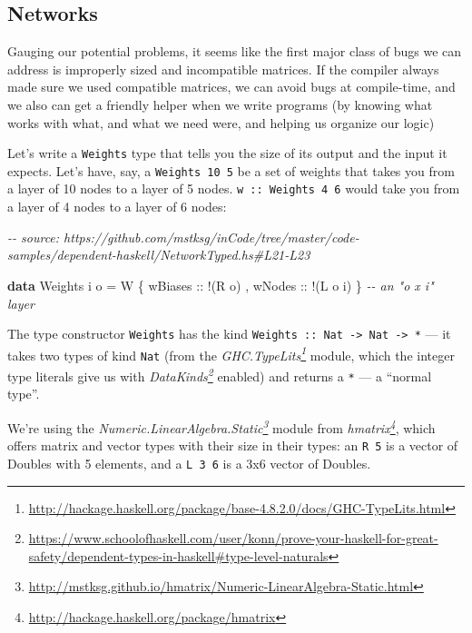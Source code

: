 \documentclass[]{article}
\newenvironment{Shaded}{}{}
\newcommand{\CommentTok}[1]{\textcolor[rgb]{0.38,0.63,0.69}{\textit{#1}}}
\newcommand{\DataTypeTok}[1]{\textcolor[rgb]{0.56,0.13,0.00}{#1}}
\newcommand{\KeywordTok}[1]{\textcolor[rgb]{0.00,0.44,0.13}{\textbf{#1}}}
\newcommand{\NormalTok}[1]{#1}
\newcommand{\OperatorTok}[1]{\textcolor[rgb]{0.40,0.40,0.40}{#1}}
\newcommand{\OtherTok}[1]{\textcolor[rgb]{0.00,0.44,0.13}{#1}}
\renewcommand{\href}[2]{#2\footnote{\url{#1}}}
\begin{document}
\hypertarget{networks}{%
\subsection{Networks}\label{networks}}

Gauging our potential problems, it seems like the first major class of bugs we
can address is improperly sized and incompatible matrices. If the compiler
always made sure we used compatible matrices, we can avoid bugs at compile-time,
and we also can get a friendly helper when we write programs (by knowing what
works with what, and what we need were, and helping us organize our logic)

Let's write a \texttt{Weights} type that tells you the size of its output and
the input it expects. Let's have, say, a \texttt{Weights\ 10\ 5} be a set of
weights that takes you from a layer of 10 nodes to a layer of 5 nodes.
\texttt{w\ ::\ Weights\ 4\ 6} would take you from a layer of 4 nodes to a layer
of 6 nodes:

\begin{Shaded}
\begin{Highlighting}[]
\CommentTok{{-}{-} source: https://github.com/mstksg/inCode/tree/master/code{-}samples/dependent{-}haskell/NetworkTyped.hs\#L21{-}L23}

\KeywordTok{data} \DataTypeTok{Weights}\NormalTok{ i o }\OtherTok{=} \DataTypeTok{W}\NormalTok{ \{}\OtherTok{ wBiases ::} \OperatorTok{!}\NormalTok{(}\DataTypeTok{R}\NormalTok{ o)}
\NormalTok{                     ,}\OtherTok{ wNodes  ::} \OperatorTok{!}\NormalTok{(}\DataTypeTok{L}\NormalTok{ o i)}
\NormalTok{                     \}                      }\CommentTok{{-}{-} an "o x i" layer}
\end{Highlighting}
\end{Shaded}

The type constructor \texttt{Weights} has the kind
\texttt{Weights\ ::\ Nat\ -\textgreater{}\ Nat\ -\textgreater{}\ *} --- it takes
two types of kind \texttt{Nat} (from the
\emph{\href{http://hackage.haskell.org/package/base-4.8.2.0/docs/GHC-TypeLits.html}{GHC.TypeLits}}
module, which the integer type literals give us with
\emph{\href{https://www.schoolofhaskell.com/user/konn/prove-your-haskell-for-great-safety/dependent-types-in-haskell\#type-level-naturals}{DataKinds}}
enabled) and returns a \texttt{*} --- a ``normal type''.

We're using the
\emph{\href{http://mstksg.github.io/hmatrix/Numeric-LinearAlgebra-Static.html}{Numeric.LinearAlgebra.Static}}
module from \emph{\href{http://hackage.haskell.org/package/hmatrix}{hmatrix}},
which offers matrix and vector types with their size in their types: an
\texttt{R\ 5} is a vector of Doubles with 5 elements, and a \texttt{L\ 3\ 6} is
a 3x6 vector of Doubles.
\end{document}
